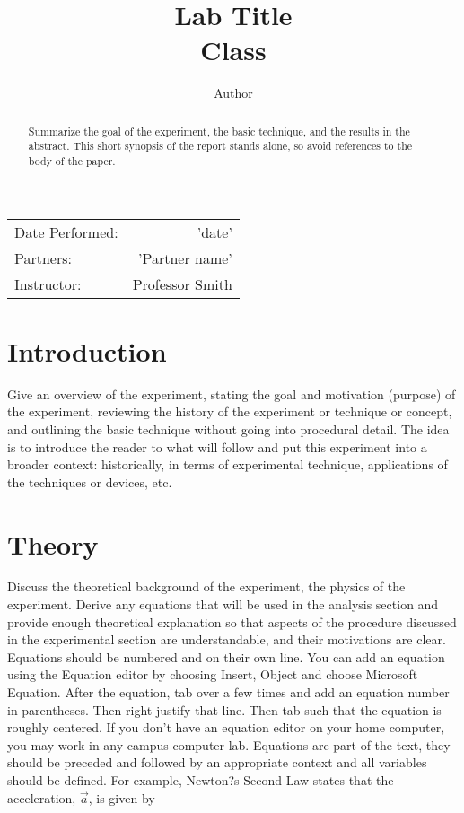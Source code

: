 \documentclass[11PT, a4paper]{article}
\title{Lab Title\\Class}\author{Author}
\begin{document}
\maketitle
\begin{center}
\begin{tabular}{l r}

Date Performed: & 'date'\\ %
Partners: &'Partner name' \\ %
Instructor: & Professor Smith %
\end{tabular}
\end{center}

\begin{abstract}
Summarize the goal of the experiment, the basic technique, and the results in the abstract. This short synopsis of the report stands alone, so avoid references to the body of the paper. \end{abstract} 


\tableofcontents %
\newpage

\section{Introduction}
Give an overview of the experiment, stating the goal and motivation (purpose) of the experiment, reviewing the history of the experiment or technique or concept, and outlining the basic technique without going into procedural detail. The idea is to introduce the reader to what will follow and put this experiment into a broader context: historically, in terms of experimental technique, applications of the techniques or devices, etc. 

\section{Theory}
Discuss the theoretical background of the experiment, the physics of the experiment. Derive any equations that will be used in the analysis section and provide enough theoretical explanation so that aspects of the procedure discussed in the experimental section are understandable, and their motivations are clear.\\

Equations should be numbered and on their own line. You can add an equation using the Equation editor by choosing Insert, Object and choose Microsoft Equation. After the equation, tab over a few times and add an equation number in parentheses. Then right justify that line. Then tab such that the equation is roughly centered. If you don't have an equation editor on your home computer, you may work in any campus computer lab. Equations are part of the text, they should be preceded and followed by an appropriate context and all variables should be defined. For example, Newton?s Second Law states that the acceleration, $\vec{a}$, is given by
\end{document}
